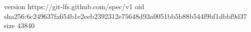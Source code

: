 version https://git-lfs.github.com/spec/v1
oid sha256:6c249637fa654b1e2eeb2392312e75648d93a0051bb5b88b544f9bf1dbbf9d37
size 43840
